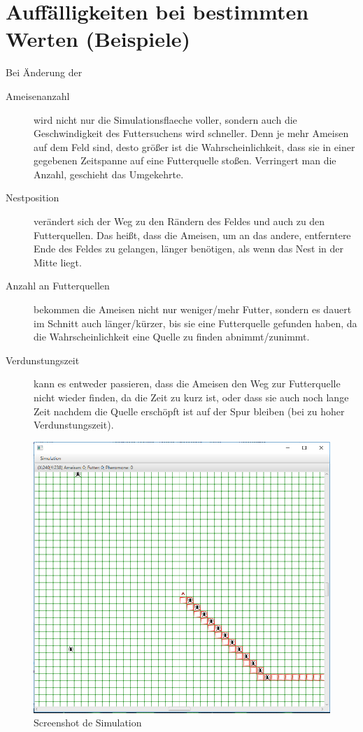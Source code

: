 \documentclass[a4paper,12pt]{scrartcl}
\begin{document}
\section*{Auffälligkeiten bei bestimmten Werten (Beispiele)}
Bei Änderung der
\begin{description}
\item[Ameisenanzahl] wird nicht nur die Simulationsflaeche voller, sondern auch die Geschwindigkeit des Futtersuchens wird schneller. Denn je mehr Ameisen auf dem Feld sind, desto größer ist die Wahrscheinlichkeit, dass sie in einer gegebenen Zeitspanne auf eine Futterquelle stoßen. Verringert man die Anzahl, geschieht das Umgekehrte.
\item[Nestposition] verändert sich der Weg zu den Rändern des Feldes und auch zu den Futterquellen. Das heißt, dass die Ameisen, um an das andere, entferntere Ende des Feldes zu gelangen, länger benötigen, als wenn das Nest in der Mitte liegt.
\item[Anzahl an Futterquellen] bekommen die Ameisen nicht nur weniger/mehr Futter, sondern es dauert im Schnitt auch länger/kürzer, bis sie eine Futterquelle gefunden haben, da die Wahrscheinlichkeit eine Quelle zu finden abnimmt/zunimmt.
\item[Verdunstungszeit] kann es entweder passieren, dass die Ameisen den Weg zur Futterquelle nicht wieder finden, da die Zeit zu kurz ist, oder dass sie auch noch lange Zeit nachdem die Quelle erschöpft ist auf der Spur bleiben (bei zu hoher Verdunstungszeit).
\end{description}
\begin{figure}[htbp]
\centering
\includegraphics[scale=0.6]{Screenshot}
\caption{Screenshot de Simulation}
\end{figure}
\end{document}
